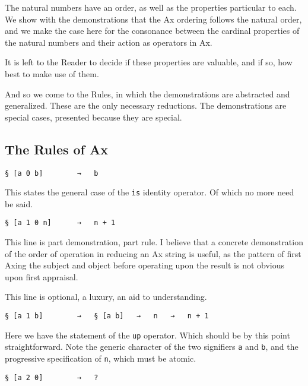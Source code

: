 \documentclass[twoside]{article}
\begin{document}
The natural numbers have an order, as well as the properties particular to each. We show with the demonstrations that the Ax ordering follows the natural order, and we make the case here for the consonance between the cardinal properties of the natural numbers and their action as operators in Ax.

It is left to the Reader to decide if these properties are valuable, and if so, how best to make use of them.

And so we come to the Rules, in which the demonstrations are abstracted and generalized. These are the only necessary reductions. The demonstrations are special cases, presented because they are special.

\subsection{The Rules of Ax}

\begin{lstlisting}[style=listingblock]
§ [a 0 b]        →   b
\end{lstlisting}

This states the general case of the \texttt{is} identity operator. Of which no more need be said.

\begin{lstlisting}[style=listingblock]
§ [a 1 0 n]      →   n + 1
\end{lstlisting}

This line is part demonstration, part rule. I believe that a concrete demonstration of the order of operation in reducing an Ax string is useful, as the pattern of first Axing the subject and object before operating upon the result is not obvious upon first appraisal.

This line is optional, a luxury, an aid to understanding.

\begin{lstlisting}[style=listingblock]
§ [a 1 b]        →   § [a b]   →   n   →   n + 1
\end{lstlisting}

Here we have the statement of the \texttt{up} operator. Which should be by this point straightforward. Note the generic character of the two signifiers \lstinline[style=inlinecode]{a} and \lstinline[style=inlinecode]{b}, and the progressive specification of \lstinline[style=inlinecode]{n}, which must be atomic.

\begin{lstlisting}[style=listingblock]
§ [a 2 0]        →   ?
\end{lstlisting}
\end{document}
